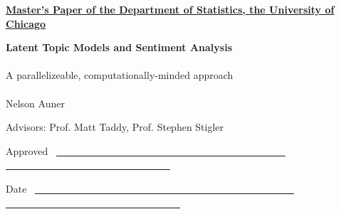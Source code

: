 \documentclass[12pt]{article}
\begin{document}
\noindent
\thispagestyle{empty}
\underline{\bf Master's Paper of the Department of Statistics, the
  University of Chicago} 


\vspace{1.8in}
\begin{center}
{\bf\LARGE Latent Topic Models and Sentiment Analysis} \\~\\
{A parallelizeable, computationally-minded approach }
\\~\\


\vspace{1.4in}
{\Large Nelson Auner}

\vspace{1.3in}
{\Large Advisors: Prof. Matt Taddy, Prof. Stephen Stigler \\{\small }}

\end{center}

\vspace{.6in}
{\Large Approved} ~\underline{~~~~~~~~~~~~~~~~~~~~~~~~~~~~~~~~~~~~~~~~~~~~~~
~~~~~~~~~~~~~~~~~~~~~~~~~~~~~~~~~}

\vspace{.2in}
{\Large Date} ~\underline{~~~~~~~~~~~~~~~~~~~~~~~~~~~~~~~~~~~~~~~~~~~~~~~~~~~~
~~~~~~~~~~~~~~~~~~~~~~~~~~~~~~~~~~~}


\newpage
\pagestyle{plain}
\setcounter{page}{1}

\begin{abstract}

\vspace{7mm}\noindent 

This paper introduces a variant to existing models of multinomial
regression for text analysis. Using the base model introduced by Taddy
(2013), we extend the data-generating model to incorporate topics not
explained by metadata. In doing so, we seek to increase
the prediction accuracy over existing techniques, bridge the gap between
multinomial regression and standard topic models, and investigate
methods for discovering new topics in a corpus. We explore computational
aspects of our approach, provide software for parallelization of the
algorithm, and conclude by proposing areas of future research.

\end{abstract}

\vspace{1.5in}
\tableofcontents
\end{document}
